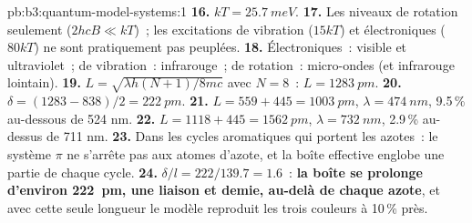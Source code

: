 \begin{solution}{pb:b3:quantum-model-systems:1}
\textbf{16.} $kT = \qty{25.7}{meV}$.
\textbf{17.} Les niveaux de rotation seulement ($2hcB \ll kT$)~; les
excitations de vibration ($15kT$) et électroniques ($80kT$) ne sont
pratiquement pas peuplées.
\textbf{18.} Électroniques~: visible et ultraviolet~; de vibration~:
infrarouge~; de rotation~: micro-ondes (et infrarouge lointain).
\textbf{19.} $L = \sqrt{\lambda h(N+1)/8mc}$ avec $N = 8$~: $L = \qty{1283}{pm}$.
\textbf{20.} $\delta = (1283 - 838)/2 = \qty{222}{pm}$.
\textbf{21.} $L = 559 + 445 = \qty{1003}{pm}$, $\lambda = \qty{474}{nm}$, 9.5\,\%
au-dessous de 524 nm.
\textbf{22.} $L = 1118 + 445 = \qty{1562}{pm}$, $\lambda = \qty{732}{nm}$, 2.9\,\%
au-dessus de 711 nm.
\textbf{23.} Dans les cycles aromatiques qui portent les azotes~: le
système $\pi$ ne s'arrête pas aux atomes d'azote, et la boîte effective
englobe une partie de chaque cycle.
\textbf{24.} $\delta/l = 222/139.7 = 1.6$~: \textbf{la boîte se prolonge
d'environ \qty{222}{pm}, une liaison et demie, au-delà de chaque azote},
et avec cette seule longueur le modèle reproduit les trois couleurs à
10\,\% près.
\end{solution}
